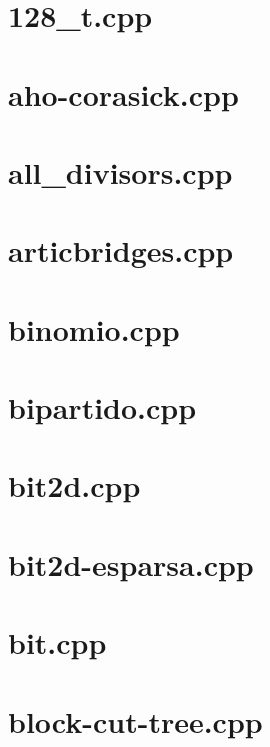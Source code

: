 \documentclass[a4paper,12pt]{article}
\begin{document}


\section{128_t.cpp}


\section{aho-corasick.cpp}


\section{all_divisors.cpp}


\section{articbridges.cpp}


\section{binomio.cpp}


\section{bipartido.cpp}


\section{bit2d.cpp}


\section{bit2d-esparsa.cpp}


\section{bit.cpp}


\section{block-cut-tree.cpp}

\end{document}
